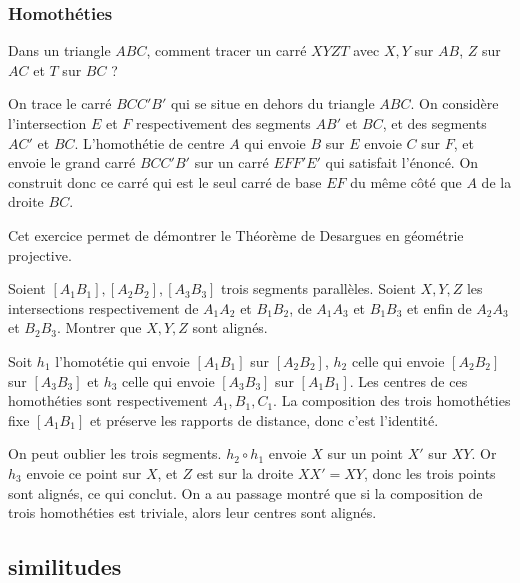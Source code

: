 \subsubsection{Homothéties}

\begin{exo}
Dans un triangle $ABC$, comment tracer un carré $XYZT$ avec $X,Y$ sur $AB$, $Z$ sur $AC$ et $T$ sur $BC$ ?
\end{exo}

\begin{sol}
On trace le carré $BCC'B'$ qui se situe en dehors du triangle $ABC$. On considère l'intersection $E$ et $F$ respectivement des segments $AB'$ et $BC$, et des segments $AC'$ et $BC$. L'homothétie de centre $A$ qui envoie $B$ sur $E$ envoie $C$ sur $F$, et envoie le grand carré $BCC'B'$ sur un carré $EFF'E'$ qui satisfait l'énoncé. On construit donc ce carré qui est le seul carré de base $EF$ du même côté que $A$ de la droite $BC$.
\end{sol}

Cet exercice permet de démontrer le Théorème de Desargues en géométrie projective.

\begin{exo}
Soient $[A_1B_1],[A_2B_2],[A_3B_3]$ trois segments parallèles. Soient $X,Y,Z$ les intersections respectivement de $A_1A_2$ et $B_1B_2$, de $A_1A_3$ et $B_1B_3$ et enfin de $A_2A_3$ et $B_2B_3$. Montrer que $X,Y,Z$ sont alignés.
\end{exo}

\begin{sol}
Soit $h_1$ l'homotétie qui envoie $[A_1B_1]$ sur $[A_2B_2]$, $h_2$ celle qui envoie $[A_2B_2]$ sur $[A_3B_3]$ et $h_3$ celle qui envoie $[A_3B_3]$ sur $[A_1B_1]$. Les centres de ces homothéties sont respectivement $A_1,B_1,C_1$. La composition des trois homothéties fixe $[A_1B_1]$ et préserve les rapports de distance, donc c'est l'identité. 

\medskip

On peut oublier les trois segments. $h_2\circ h_1$ envoie $X$ sur un point $X'$ sur $XY$. Or $h_3$ envoie ce point sur $X$, et $Z$ est sur la droite $XX'=XY$, donc les trois points sont alignés, ce qui conclut. On a au passage montré que si la composition de trois homothéties est triviale, alors leur centres sont alignés.
\end{sol}

\subsection*{similitudes}

